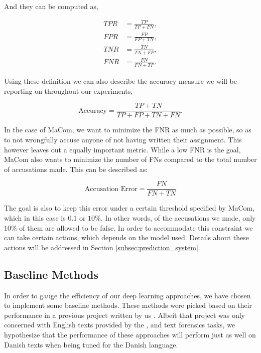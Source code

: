 And they can be computed as,

\begin{align}
    TPR &= \frac{TP}{TP + FN}, \\
    FPR &= \frac{FP}{FP + TN}, \\
    TNR &= \frac{TN}{TN + FP}, \\
    FNR &= \frac{FN}{FN + TP}.
\end{align}

Using these definition we can also describe the accuracy measure we will be
reporting on throughout our experiments,

\begin{equation}
    \text{Accuracy} = \frac{TP + TN}{TP + FP + TN + FN}.
\end{equation}

In the case of MaCom, we want to minimize the \gls{FNR} as much as possible,
so as to not wrongfully accuse anyone of not having written their assignment.
This however leaves out a equally important metric. While a low \gls{FNR} is the
goal, MaCom also wants to minimize the number of \gls{FN}s compared to the total
number of accusations made. This can be described as:

\begin{equation}
    \text{Accusation Error} = \frac{FN}{FN + TN}
\end{equation}

The goal is also to keep this error under a certain threshold specified
by MaCom, which in this case is $0.1$ or $10\%$. In other words, of the
accusations we made, only $10\%$ of them are allowed to be false. In order
to accommodate this constraint we can take certain actions, which depends
on the model used. Details about these actions will be addressed in Section
\ref{subsec:prediction_system}.


\subsection{Baseline Methods}

In order to gauge the efficiency of our deep learning approaches, we have chosen
to implement some baseline methods. These methods were picked based on their
performance in a previous project written by us \citet{US}. Albeit that project
was only concerned with English texts provided by the \citet{pan:2015}, and
\citet{pan:2014} text forensics tasks, we hypothesize that the performance of
these approaches will perform just as well on Danish texts when being tuned for
the Danish language.


